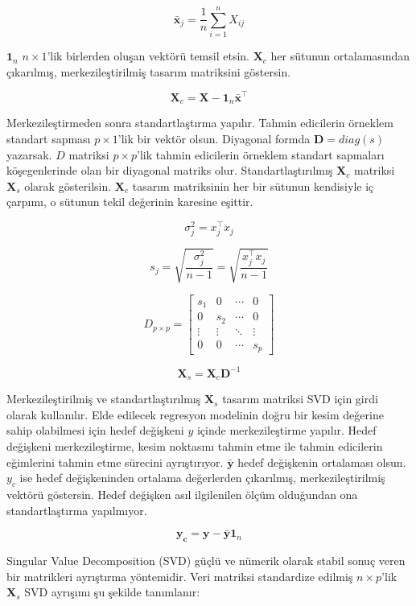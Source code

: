 \documentclass[12pt]{article}
\begin{document}
\[
  \boldsymbol{\bar{x}}_j = \frac{1}{n} \sum_{i=1}^{n} X_{ij}
\]

$\boldsymbol{1}_n$ $n \times 1$'lik birlerden oluşan vektörü temsil etsin. $\boldsymbol{X}_c$ her sütunun ortalamasından çıkarılmış, merkezileştirilmiş tasarım matriksini göstersin.

\[
  \mathbf{X}_c = \mathbf{X} - \mathbf{1}_n \boldsymbol{\bar{\textbf{x}}}^\top
\]

Merkezileştirmeden sonra standartlaştırma yapılır. Tahmin edicilerin örneklem standart sapması $p \times 1$'lik bir vektör olsun. Diyagonal formda $\boldsymbol{D}=diag(s)$ yazarsak. $D$ matriksi $p \times p$'lik tahmin edicilerin örneklem standart sapmaları köşegenlerinde olan bir diyagonal matriks olur. Standartlaştırılmış $\textbf{X}_c$ matriksi $\textbf{X}_s$ olarak gösterilsin. $\mathbf{X}_c$ tasarım matriksinin her bir sütunun kendisiyle iç çarpımı, o sütunun tekil değerinin karesine eşittir.

\[
\sigma_j^2 = x_j^\top x_j
\]

\[
s_j = \sqrt{\frac{\sigma_j^2}{n-1}} = \sqrt{\frac{x_j^\top x_j}{n-1}}
\]


\[
D_{p \times p} = \begin{bmatrix}
s_1 & 0 & \cdots & 0 \\
0 & s_2 & \cdots & 0 \\
\vdots & \vdots & \ddots & \vdots \\
0 & 0 & \cdots & s_p
\end{bmatrix}
\]

\[
  \mathbf{X}_s = \mathbf{X}_c \mathbf{D}^{-1}
\]

\newpage

Merkezileştirilmiş ve standartlaştırılmış $\mathbf{X}_s$ tasarım matriksi SVD için girdi olarak kullanılır. Elde edilecek regresyon modelinin doğru bir kesim değerine sahip olabilmesi için hedef değişkeni $y$ içinde merkezileştirme yapılır. Hedef değişkeni merkezileştirme, kesim noktasını tahmin etme ile  tahmin edicilerin eğimlerini tahmin etme sürecini ayrıştırıyor. $\bar{\mathbf{y}}$ hedef değişkenin ortalaması olsun. $y_c$ ise hedef değişkeninden ortalama değerlerden çıkarılmış, merkezileştirilmiş vektörü göstersin. Hedef değişken asıl ilgilenilen ölçüm olduğundan ona standartlaştırma yapılmıyor.

\[
  \mathbf{y_c} = \mathbf{y} - \bar{\mathbf{y}}\mathbf{1}_n
\]

Singular Value Decomposition (SVD) güçlü ve nümerik olarak stabil sonuç veren bir matrikleri ayrıştırma yöntemidir. Veri matriksi standardize edilmiş $n \times p$'lik $\mathbf{X}_s$ SVD ayrışımı şu şekilde tanımlanır:
\end{document}
